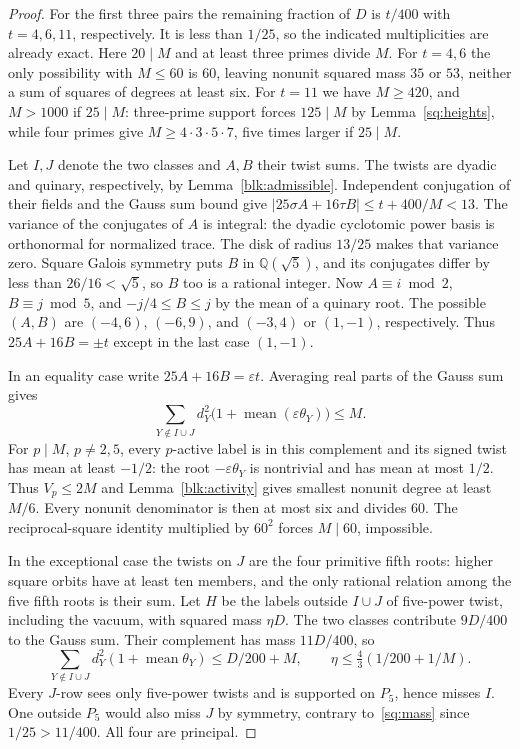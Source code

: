 \documentclass[11pt]{amsart}
\numberwithin{equation}{section}
\begin{document}
\begin{proof}
For the first three pairs the remaining fraction of $D$ is $t/400$ with $t=4,6,11$, respectively. It is less than $1/25$, so the indicated multiplicities are already exact. Here $20\mid M$ and at least three primes divide $M$. For $t=4,6$ the only possibility with $M\le60$ is $60$, leaving nonunit squared mass $35$ or $53$, neither a sum of squares of degrees at least six. For $t=11$ we have $M\ge420$, and $M>1000$ if $25\mid M$: three-prime support forces $125\mid M$ by Lemma~\ref{sq:heights}, while four primes give $M\ge4\cdot3\cdot5\cdot7$, five times larger if $25\mid M$.

Let $I,J$ denote the two classes and $A,B$ their twist sums. The twists are dyadic and quinary, respectively, by Lemma~\ref{blk:admissible}. Independent conjugation of their fields and the Gauss sum bound give $|25\sigma A+16\tau B|\le t+400/M<13$. The variance of the conjugates of $A$ is integral: the dyadic cyclotomic power basis is orthonormal for normalized trace. The disk of radius $13/25$ makes that variance zero. Square Galois symmetry puts $B$ in $\mathbb Q(\sqrt5)$, and its conjugates differ by less than $26/16<\sqrt5$, so $B$ too is a rational integer. Now $A\equiv i\bmod2$, $B\equiv j\bmod5$, and $-j/4\le B\le j$ by the mean of a quinary root. The possible $(A,B)$ are $(-4,6)$, $(-6,9)$, and $(-3,4)$ or $(1,-1)$, respectively. Thus $25A+16B=\pm t$ except in the last case $(1,-1)$.

In an equality case write $25A+16B=\varepsilon t$. Averaging real parts of the Gauss sum gives
\[
 \sum_{Y\notin I\cup J}d_Y^2\bigl(1+\operatorname{mean}(\varepsilon\theta_Y)\bigr)\le M.
\]
For $p\mid M$, $p\ne2,5$, every $p$-active label is in this complement and its signed twist has mean at least $-1/2$: the root $-\varepsilon\theta_Y$ is nontrivial and has mean at most $1/2$. Thus $V_p\le2M$ and Lemma~\ref{blk:activity} gives smallest nonunit degree at least $M/6$. Every nonunit denominator is then at most six and divides $60$. The reciprocal-square identity multiplied by $60^2$ forces $M\mid60$, impossible.

In the exceptional case the twists on $J$ are the four primitive fifth roots: higher square orbits have at least ten members, and the only rational relation among the five fifth roots is their sum. Let $H$ be the labels outside $I\cup J$ of five-power twist, including the vacuum, with squared mass $\eta D$. The two classes contribute $9D/400$ to the Gauss sum. Their complement has mass $11D/400$, so
\[
 \sum_{Y\notin I\cup J}d_Y^2(1+\operatorname{mean}\theta_Y)\le D/200+M,
 \qquad \eta\le\tfrac43(1/200+1/M).
\]
Every $J$-row sees only five-power twists and is supported on $P_5$, hence misses $I$. One outside $P_5$ would also miss $J$ by symmetry, contrary to~\eqref{sq:mass} since $1/25>11/400$. All four are principal.


\end{proof}
\end{document}
